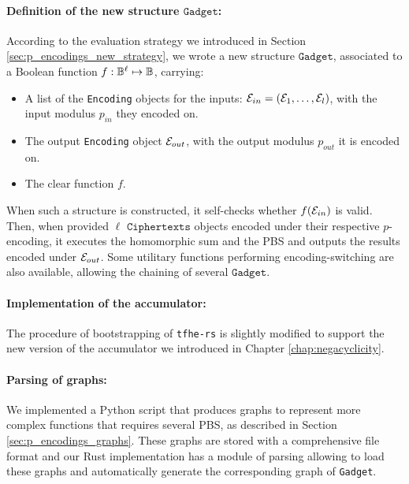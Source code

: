 \paragraph{Definition of the new structure $\texttt{Gadget}$: } According to the evaluation strategy we introduced in Section \ref{sec:p_encodings_new_strategy}, we wrote a new structure $\texttt{Gadget}$, associated to a Boolean function $f: \mathbb{B}^\ell \mapsto \mathbb{B}$, carrying:
\begin{itemize}
    \item A list of the \texttt{Encoding} objects for the inputs: $\mathcal{E}_{in} = (\mathcal{E}_1, \dots, \mathcal{E}_l)$, with the input modulus $p_{in}$ they encoded on.
    \item The output \texttt{Encoding} object $\mathcal{E}_{out}$, with the output modulus $p_{out}$ it is encoded on.
    \item The clear function $f$.
\end{itemize}
When such a structure is constructed, it self-checks whether $f(\mathcal{E}_{in})$ is valid. Then, when provided $\ell$ $\texttt{Ciphertexts}$ objects encoded under their respective $p$-encoding, it executes the homomorphic sum and the \gls{PBS} and outputs the results encoded under $\mathcal{E}_{out}$. Some utilitary functions performing encoding-switching are also available, allowing the chaining of several $\texttt{Gadget}$.


\paragraph{Implementation of the accumulator: } The procedure of bootstrapping of \texttt{tfhe-rs} is slightly modified to support the new version of the accumulator we introduced in Chapter \ref{chap:negacyclicity}.

\paragraph{Parsing of graphs: } We implemented a Python script that produces graphs to represent more complex functions that requires several \gls{PBS}, as described in Section \ref{sec:p_encodings_graphs}. These graphs are stored with a comprehensive file format and our Rust implementation has a module of parsing allowing to load these graphs and automatically generate the corresponding graph of \texttt{Gadget}.




